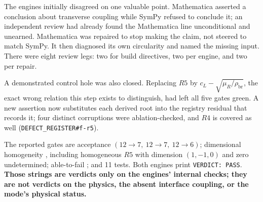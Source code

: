 The engines initially disagreed on one valuable point. Mathematica asserted a
conclusion about transverse coupling while SymPy refused to conclude it; an
independent review had already found the Mathematica line unconditional and
unearned. Mathematica was repaired to stop making the claim, not steered to
match SymPy. It then diagnosed its own circularity and named the missing input.
There were eight review legs: two for build directives, two per engine, and two
per repair.

A demonstrated control hole was also closed. Replacing \(R5\) by
\(c_L-\sqrt{\mu_R/\rho_{\mathrm{br}}}\), the exact wrong relation this step
exists to distinguish, had left all five gates green. A new assertion now
substitutes each derived root into the registry residual that records it; four
distinct corruptions were ablation-checked, and \(R4\) is covered as well
(\texttt{DEFECT\_REGISTER\#f-r5}).

The reported gates are acceptance 
\((12\mathbin{\to}7,\ 12\mathbin{\to}7,\ 12\mathbin{\to}6)\);
dimensional homogeneity , including homogeneous \(R5\) with
dimension \((1,-1,0)\) and zero undetermined; able-to-fail ;
and 11 tests. Both engines print \texttt{VERDICT: PASS}. \textbf{Those strings
are verdicts only on the engines' internal checks; they are not verdicts on the
physics, the absent interface coupling, or the mode's physical status.}

